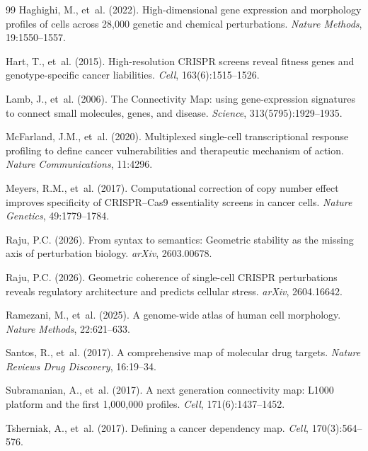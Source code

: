 \documentclass[11pt]{article}
\begin{document}
\begin{thebibliography}{99}
Haghighi, M., et~al. (2022).
High-dimensional gene expression and morphology profiles of cells across 28,000 genetic and chemical perturbations.
\textit{Nature Methods}, 19:1550--1557.

Hart, T., et~al. (2015).
High-resolution CRISPR screens reveal fitness genes and genotype-specific cancer liabilities.
\textit{Cell}, 163(6):1515--1526.

Lamb, J., et~al. (2006).
The Connectivity Map: using gene-expression signatures to connect small molecules, genes, and disease.
\textit{Science}, 313(5795):1929--1935.

McFarland, J.M., et~al. (2020).
Multiplexed single-cell transcriptional response profiling to define cancer vulnerabilities and therapeutic mechanism of action.
\textit{Nature Communications}, 11:4296.

Meyers, R.M., et~al. (2017).
Computational correction of copy number effect improves specificity of CRISPR--Cas9 essentiality screens in cancer cells.
\textit{Nature Genetics}, 49:1779--1784.

Raju, P.C. (2026).
From syntax to semantics: Geometric stability as the missing axis of perturbation biology.
\textit{arXiv}, 2603.00678.

Raju, P.C. (2026).
Geometric coherence of single-cell CRISPR perturbations reveals regulatory architecture and predicts cellular stress.
\textit{arXiv}, 2604.16642.

Ramezani, M., et~al. (2025).
A genome-wide atlas of human cell morphology.
\textit{Nature Methods}, 22:621--633.

Santos, R., et~al. (2017).
A comprehensive map of molecular drug targets.
\textit{Nature Reviews Drug Discovery}, 16:19--34.

Subramanian, A., et~al. (2017).
A next generation connectivity map: L1000 platform and the first 1,000,000 profiles.
\textit{Cell}, 171(6):1437--1452.

Tsherniak, A., et~al. (2017).
Defining a cancer dependency map.
\textit{Cell}, 170(3):564--576.


\end{thebibliography}
\end{document}
